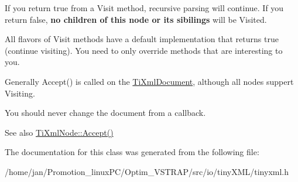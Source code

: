 If you return \textquotesingle{}true\textquotesingle{} from a Visit method, recursive parsing will continue. If you return false, {\bfseries no children of this node or its sibilings} will be Visited.

All flavors of Visit methods have a default implementation that returns \textquotesingle{}true\textquotesingle{} (continue visiting). You need to only override methods that are interesting to you.

Generally Accept() is called on the \hyperlink{classTiXmlDocument}{Ti\+Xml\+Document}, although all nodes suppert Visiting.

You should never change the document from a callback.

\begin{DoxySeeAlso}{See also}
\hyperlink{classTiXmlNode_acc0f88b7462c6cb73809d410a4f5bb86}{Ti\+Xml\+Node\+::\+Accept()} 
\end{DoxySeeAlso}


The documentation for this class was generated from the following file\+:\begin{DoxyCompactItemize}
\item 
/home/jan/\+Promotion\+\_\+linux\+P\+C/\+Optim\+\_\+\+V\+S\+T\+R\+A\+P/src/io/tiny\+X\+M\+L/tinyxml.\+h\end{DoxyCompactItemize}
